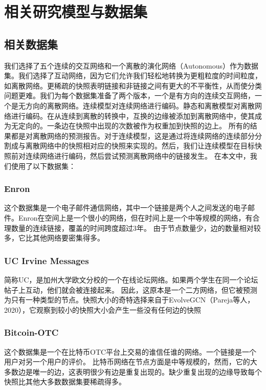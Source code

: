 \documentclass[conference]{IEEEtran}
\begin{document}
\section{相关研究模型与数据集}

\subsection{相关数据集}
我们选择了五个连续的交互网络和一个离散的演化网络（Autonomous）作为数据集。我们选择了互动网络，因为它们允许我们轻松地转换为更粗粒度的时间粒度，如离散网络。更稀疏的快照表明链接和非链接之间有更大的不平衡性，从而使分类问题更难。我们为每个数据集准备了两个版本，一个是有方向的连续交互网络，一个是无方向的离散网络。连续模型对连续网络进行编码。静态和离散模型对离散网络进行编码。在从连续到离散的转换中，互换的边缘被添加到离散网络中，使其成为无定向的。一条边在快照中出现的次数被作为权重加到快照的边上。
所有的结果都是对离散网络的预测报告。对于连续模型，这是通过将连续网络的连续部分分割成与离散网络中的快照相对应的快照来实现的。然后，我们让连续模型在目标快照前对连续网络进行编码，然后尝试预测离散网络中的链接发生。
在本文中，我们使用了以下数据集：

\subsubsection{Enron}
这个数据集是一个电子邮件通信网络，其中一个链接是两个人之间发送的电子邮件。Enron在空间上是一个很小的网络，但在时间上是一个中等规模的网络，有合理数量的连续链接，覆盖的时间跨度超过3年。
由于节点数量少，边的数量相对较多，它比其他网络要密集得多。

\subsubsection{UC Irvine Messages}
简称UC，是加州大学欧文分校的一个在线论坛网络。如果两个学生在同一个论坛帖子上互动，他们就会被连接起来。
因此，这原本是一个二方网络，但它被预测为只有一种类型的节点。快照大小的奇特选择来自于EvolveGCN（Pareja等人，2020），它观察到较小的快照大小会产生一些没有任何边的快照

\subsubsection{Bitcoin-OTC}
这个数据集是一个在比特币OTC平台上交易的谁信任谁的网络。一个链接是一个用户对另一个用户的评价。
比特币网络在节点方面是中等规模的，然而，它的大多数边是唯一的边，这表明很少有边是重复出现的。缺少重复出现的边缘导致每个快照比其他大多数数据集要稀疏得多。
\end{document}

